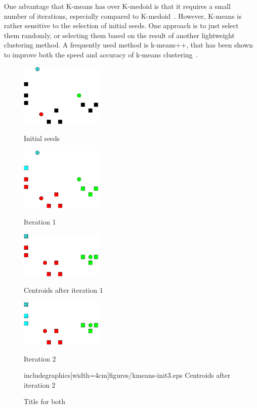 One advantage that K-means has over K-medoid is that it requires a small number of iterations, especially compared to K-medoid~\cite{aggarwal2012survey, schutze1997projections}.
However, K-means is rather sensitive to the selection of initial seeds.
One approach is to just select them randomly, or selecting them based on the result of another lightweight clustering method.
A frequently used method is k-means++, that has been shown to improve both the speed and accuracy of k-means clustering~\cite{arthur2007k}.

\begin{figure}
    \begin{subfig}[b]{0.3\textwidth}
    \includegraphics[width=4cm]{figures/kmeans-init.eps}
    \caption{Initial seeds}
    \end{subfig}
    \begin{subfig}[b]{0.3\textwidth}
    \includegraphics[width=4cm]{figures/kmeans-iter1.eps}
    \caption{Iteration 1}
    \end{subfig}
    \begin{subfig}[b]{0.3\textwidth}
    \includegraphics[width=4cm]{figures/kmeans-init2.eps}
    \caption{Centroids after iteration 1}
    \end{subfig}
    \begin{subfig}[b]{0.3\textwidth}
    \includegraphics[width=4cm]{figures/kmeans-iter2.eps}
    \caption{Iteration 2}
    \end{subfig}
    \begin{subfig}[b]{0.3\textwidth}
    includegraphics[width=4cm]{figures/kmeans-init3.eps}
    {}Centroids after iteration 2
    \end{subfig}
    \caption{Title for both}
\end{figure}

